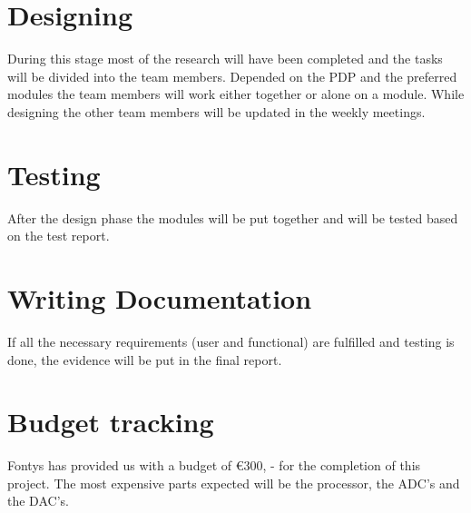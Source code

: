 	\section{Designing}
	
During this stage most of the research will have been completed and the tasks will be divided into the team members. Depended on the PDP and the preferred modules the team members will work either together or alone on a module. While designing the other team members will be updated in the weekly meetings. 
	
	\section{Testing}
	
After the design phase the modules will be put together and will be tested based on the test report.
	
	\section{Writing Documentation}
	
If all the necessary requirements (user and functional) are fulfilled and testing is done, the evidence will be put in the final report.
	
	\section{Budget tracking}
	
Fontys has provided us with a budget of €300, - for the completion of this project. The most expensive parts expected will be the processor, the ADC’s and the DAC’s.


	